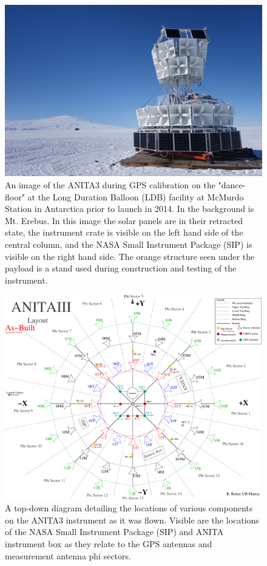 \begin{figure}
\centering
	\includegraphics[width=\textwidth]{figures/ANITA3_dancefloor}
	\caption{An image of the ANITA3 during GPS calibration on the "dance-floor" at the Long Duration Balloon (LDB) facility at McMurdo Station in Antarctica prior to launch in 2014.  In the background is Mt. Erebus.  In this image the solar panels are in their retracted state, the instrument crate is visible on the left hand side of the central column, and the NASA Small Instrument Package (SIP) is visible on the right hand side. The orange structure seen under the payload is a stand used during construction and testing of the instrument.}
	\label{fig:ANITA3_dancefloor}
\end{figure}

\begin{figure}
\centering
	\includegraphics[width=\textwidth]{figures/ANITA3_layout_asBuilt}
	\caption{A top-down diagram detailing the locations of various components on the ANITA3 instrument as it was flown.  Visible are the locations of the NASA Small Instrument Package (SIP) and ANITA instrument box as they relate to the GPS antennas and measurement antenna phi sectors.}
	\label{fig:ANITA3_asBuilt}
\end{figure}

